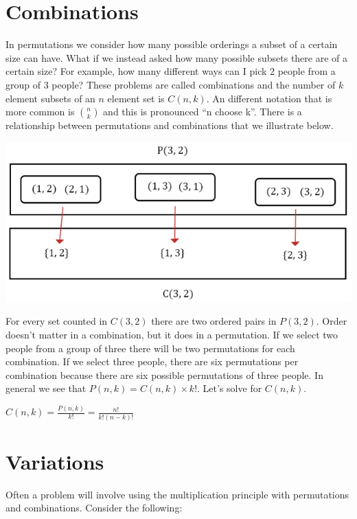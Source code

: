 \documentclass[
]{book}
\begin{document}
\hypertarget{combinations}{%
\section{Combinations}\label{combinations}}

In permutations we consider how many possible orderings a subset of a certain size can have. What if we instead asked how many possible subsets there are of a certain size? For example, how many different ways can I pick \(2\) people from a group of \(3\) people? These problems are called combinations and the number of \(k\) element subsets of an \(n\) element set is \(C(n,k)\). An different notation that is more common is \(n \choose k\) and this is pronounced ``n choose k''. There is a relationship between permutations and combinations that we illustrate below.

\includegraphics{Pictures/02-Counting/P(3,2)vsC(3,2).PNG}

For every set counted in \(C(3,2)\) there are two ordered pairs in \(P(3,2)\). Order doesn't matter in a combination, but it does in a permutation. If we select two people from a group of three there will be two permutations for each combination. If we select three people, there are six permutations per combination because there are six possible permutations of three people. In general we see that \(P(n,k) = C(n,k)\times k!\). Let's solve for \(C(n,k)\).

\(C(n,k) = \frac{P(n,k)}{k!} = \frac{n!}{k!(n-k)!}\)

\hypertarget{variations}{%
\section{Variations}\label{variations}}

Often a problem will involve using the multiplication principle with permutations and combinations. Consider the following:
\end{document}
